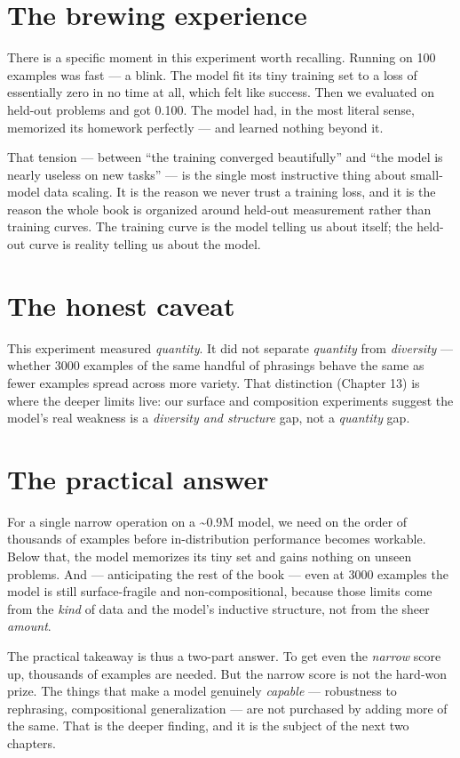 \section{The brewing experience}\label{the-brewing-experience}

There is a specific moment in this experiment worth recalling. Running
on 100 examples was fast --- a blink. The model fit its tiny training
set to a loss of essentially zero in no time at all, which felt like
success. Then we evaluated on held-out problems and got 0.100. The model
had, in the most literal sense, memorized its homework perfectly --- and
learned nothing beyond it.

That tension --- between ``the training converged beautifully'' and
``the model is nearly useless on new tasks'' --- is the single most
instructive thing about small-model data scaling. It is the reason we
never trust a training loss, and it is the reason the whole book is
organized around held-out measurement rather than training curves. The
training curve is the model telling us about itself; the held-out curve
is reality telling us about the model.

\section{The honest caveat}\label{the-honest-caveat}

This experiment measured \emph{quantity}. It did not separate
\emph{quantity} from \emph{diversity} --- whether 3000 examples of the
same handful of phrasings behave the same as fewer examples spread
across more variety. That distinction (Chapter 13) is where the deeper
limits live: our surface and composition experiments suggest the model's
real weakness is a \emph{diversity and structure} gap, not a
\emph{quantity} gap.

\section{The practical answer}\label{the-practical-answer}

For a single narrow operation on a \textasciitilde0.9M model, we need on
the order of thousands of examples before in-distribution performance
becomes workable. Below that, the model memorizes its tiny set and gains
nothing on unseen problems. And --- anticipating the rest of the book
--- even at 3000 examples the model is still surface-fragile and
non-compositional, because those limits come from the \emph{kind} of
data and the model's inductive structure, not from the sheer
\emph{amount}.

The practical takeaway is thus a two-part answer. To get even the
\emph{narrow} score up, thousands of examples are needed. But the narrow
score is not the hard-won prize. The things that make a model genuinely
\emph{capable} --- robustness to rephrasing, compositional
generalization --- are not purchased by adding more of the same. That is
the deeper finding, and it is the subject of the next two chapters.
